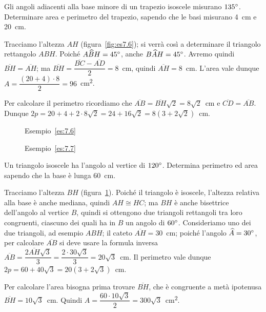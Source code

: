 \begin{exrig}
\begin{esempio}\label{es:7.6}
Gli angoli adiacenti alla base minore di un trapezio isoscele misurano $135{}^{\circ}$. Determinare area e perimetro del trapezio, sapendo che le basi misurano 4~cm e 20~cm.\vspace{7pt}

Tracciamo l'altezza $AH$ (figura~\ref{fig:es7.6}); si verrà così a determinare il triangolo rettangolo $ABH$. Poiché $A\widehat{B}H=45{}^{\circ}$, anche $B\widehat{A}H=45{}^{\circ}$. Avremo quindi $\overline{BH}=\overline{AH}$; ma $\overline{BH}=\dfrac{\overline{BC}-\overline{AD}}{2}=8$~cm, quindi $\overline{AH}=8$~cm. L'area vale dunque $A=\dfrac{(20+4)\cdot 8}{2}=96$~cm\textsuperscript{2}.

Per calcolare il perimetro ricordiamo che $\overline{AB}=\overline{BH}\sqrt{2}=8\sqrt{2}$~cm e $\overline{CD}=\overline{AB}$.
Dunque $2p=20+4+2\cdot 8\sqrt{2}=24+16\sqrt{2}=8(3+2\sqrt{2})$~cm.
\end{esempio}

\begin{figure}[!htb]
	\begin{center}
		\begin{minipage}{0.45\textwidth}
			\centering
			
			\caption{Esempio~\ref{es:7.6}}\label{fig:es7.6}
		\end{minipage}
		\hspace{0.03\textwidth}	
		\begin{minipage}{0.45\textwidth}
			\centering
			
			\caption{Esempio~\ref{es:7.7}}\label{fig:es7.7}
		\end{minipage}
	\end{center}
\end{figure}

\begin{esempio}\label{es:7.7}
Un triangolo isoscele ha l'angolo al vertice di $120{}^{\circ}$. Determina perimetro ed area sapendo che la base è lunga 60~cm.\vspace{7pt}

Tracciamo l'altezza $BH$ (figura~\ref{fig:es7.7}). Poiché il triangolo è isoscele, l'altezza relativa alla base è anche mediana, quindi $AH\cong HC$; ma $BH$ è anche bisettrice dell'angolo al vertice $B$, quindi si ottengono due triangoli rettangoli tra loro congruenti, ciascuno dei quali ha in $B$ un angolo di $60{}^{\circ}$. Consideriamo uno dei due triangoli, ad esempio $ABH$; il cateto $\overline{AH}=30$~cm; poiché l'angolo $\widehat{A}=30{}^{\circ}$, per calcolare $\overline{AB}$ si deve usare la formula inversa $\overline{AB}=\dfrac{2\overline{AH}\sqrt{3}}{3}=\dfrac{2\cdot 30\sqrt{3}}{3}=20\sqrt{3}$~cm.
Il perimetro vale dunque $2p=60 + 40\sqrt{3} = 20 (3 + 2\sqrt{3})$~cm.

Per calcolare l'area bisogna prima trovare $\overline{BH}$, che è congruente a metà ipotenusa $\overline{BH}=10\sqrt{3}$~cm. Quindi $A=\dfrac{60\cdot 10\sqrt{3}}{2}=300\sqrt{3}$~cm\textsuperscript{2}.
\end{esempio}
\end{exrig}

